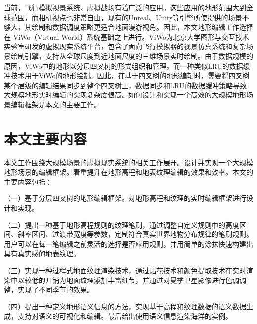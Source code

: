 当前，飞行模拟视景系统、虚拟战场有着广泛的应用。这些应用的地形范围大到全球范围，而相机视点也非常自由，现有的Unreal、Unity等引擎所使提供的场景不够大，其绘制和数据调度策略更适合地面漫游视角。因此，本文地形编辑工作选择在 ViWo（Virtual World）系统基础之上进行。ViWo为北京大学图形与交互技术实验室研发的虚拟现实系统平台，包含了面向飞行模拟器的视景仿真系统和复杂场景绘制引擎，支持从全球尺度到近地面尺度的三维场景实时绘制。由于数据规模的原因，ViWo中的地形以分层四叉树的形式组织和管理。而一种类似LRU的数据缓冲技术用于ViWo的地形绘制。因此，在基于四叉树的地形编辑时，需要将四叉树某个层级的编辑结果同步到整个四叉树上，数据同步和LRU的数据缓冲策略导致大规模地形实时编辑的实现复杂度很高。如何设计和实现一个高效的大规模地形场景编辑框架是本文的主要工作。\par
\section{本文主要内容}
本文工作围绕大规模场景的虚拟现实系统的相关工作展开。设计并实现一个大规模地形场景的编辑框架。着重提升在地形高程和地表纹理编辑的效果和效率。本文的主要内容包括：\par
（一）基于分层四叉树的地形编辑框架。对地形高程和纹理的实时编辑框架进行设计和实现。\par
（二）提出一种基于地形高程规则的纹理笔刷，通过调整自定义规则中的高度区间、斜率区间、过渡带宽度等参数，定制符合真实世界地物分布规律的笔刷规则。用户可以在每一笔编辑之前灵活的选择是否应用规则，并用简单的涂抹快速构建出具有真实感的地表纹理。\par
（三）实现一种过程式地面纹理渲染技术，通过贴花技术和颜色提取技术在实时渲染中以较低的开销为地面纹理添加丰富细节，并通过对夏季卫星影像进行色调调整，实现了不同季节的效果。\par
（四）提出一种定义地形语义信息的方法，实现基于高程和纹理数据的语义数据生成，支持对语义的可视化和编辑。最后给出使用语义信息渲染海洋的实例。\par
